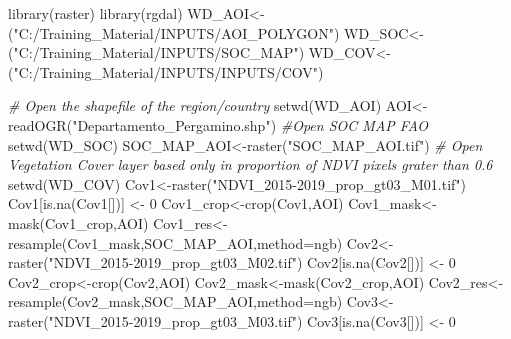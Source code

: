\documentclass[
  10pt,
  b5paper,
]{book}
\newenvironment{Shaded}{\begin{snugshade}}{\end{snugshade}}
\newcommand{\AttributeTok}[1]{\textcolor[rgb]{0.77,0.63,0.00}{#1}}
\newcommand{\CommentTok}[1]{\textcolor[rgb]{0.56,0.35,0.01}{\textit{#1}}}
\newcommand{\DecValTok}[1]{\textcolor[rgb]{0.00,0.00,0.81}{#1}}
\newcommand{\FunctionTok}[1]{\textcolor[rgb]{0.00,0.00,0.00}{#1}}
\newcommand{\NormalTok}[1]{#1}
\newcommand{\OtherTok}[1]{\textcolor[rgb]{0.56,0.35,0.01}{#1}}
\newcommand{\StringTok}[1]{\textcolor[rgb]{0.31,0.60,0.02}{#1}}
\begin{document}
\begin{Shaded}
\begin{Highlighting}[]
\FunctionTok{library}\NormalTok{(raster)}
\FunctionTok{library}\NormalTok{(rgdal)}
\NormalTok{WD\_AOI}\OtherTok{\textless{}{-}}\NormalTok{(}\StringTok{"C:/Training\_Material/INPUTS/AOI\_POLYGON"}\NormalTok{)}
\NormalTok{WD\_SOC}\OtherTok{\textless{}{-}}\NormalTok{(}\StringTok{"C:/Training\_Material/INPUTS/SOC\_MAP"}\NormalTok{)}
\NormalTok{WD\_COV}\OtherTok{\textless{}{-}}\NormalTok{(}\StringTok{"C:/Training\_Material/INPUTS/INPUTS/COV"}\NormalTok{)}


\CommentTok{\# Open the shapefile of the region/country}
\FunctionTok{setwd}\NormalTok{(WD\_AOI)}
\NormalTok{AOI}\OtherTok{\textless{}{-}}\FunctionTok{readOGR}\NormalTok{(}\StringTok{"Departamento\_Pergamino.shp"}\NormalTok{)}
\CommentTok{\#Open SOC MAP FAO}
\FunctionTok{setwd}\NormalTok{(WD\_SOC)}
\NormalTok{SOC\_MAP\_AOI}\OtherTok{\textless{}{-}}\FunctionTok{raster}\NormalTok{(}\StringTok{"SOC\_MAP\_AOI.tif"}\NormalTok{)}
\CommentTok{\# Open Vegetation Cover layer based only in proportion of NDVI pixels grater than 0.6 }
\FunctionTok{setwd}\NormalTok{(WD\_COV)}
\NormalTok{Cov1}\OtherTok{\textless{}{-}}\FunctionTok{raster}\NormalTok{(}\StringTok{"NDVI\_2015{-}2019\_prop\_gt03\_M01.tif"}\NormalTok{)}
\NormalTok{Cov1[}\FunctionTok{is.na}\NormalTok{(Cov1[])] }\OtherTok{\textless{}{-}} \DecValTok{0}
\NormalTok{Cov1\_crop}\OtherTok{\textless{}{-}}\FunctionTok{crop}\NormalTok{(Cov1,AOI)}
\NormalTok{Cov1\_mask}\OtherTok{\textless{}{-}}\FunctionTok{mask}\NormalTok{(Cov1\_crop,AOI)}
\NormalTok{Cov1\_res}\OtherTok{\textless{}{-}}\FunctionTok{resample}\NormalTok{(Cov1\_mask,SOC\_MAP\_AOI,}\AttributeTok{method=}\StringTok{\textquotesingle{}ngb\textquotesingle{}}\NormalTok{) }
\NormalTok{Cov2}\OtherTok{\textless{}{-}}\FunctionTok{raster}\NormalTok{(}\StringTok{"NDVI\_2015{-}2019\_prop\_gt03\_M02.tif"}\NormalTok{)}
\NormalTok{Cov2[}\FunctionTok{is.na}\NormalTok{(Cov2[])] }\OtherTok{\textless{}{-}} \DecValTok{0}
\NormalTok{Cov2\_crop}\OtherTok{\textless{}{-}}\FunctionTok{crop}\NormalTok{(Cov2,AOI)}
\NormalTok{Cov2\_mask}\OtherTok{\textless{}{-}}\FunctionTok{mask}\NormalTok{(Cov2\_crop,AOI)}
\NormalTok{Cov2\_res}\OtherTok{\textless{}{-}}\FunctionTok{resample}\NormalTok{(Cov2\_mask,SOC\_MAP\_AOI,}\AttributeTok{method=}\StringTok{\textquotesingle{}ngb\textquotesingle{}}\NormalTok{) }
\NormalTok{Cov3}\OtherTok{\textless{}{-}}\FunctionTok{raster}\NormalTok{(}\StringTok{"NDVI\_2015{-}2019\_prop\_gt03\_M03.tif"}\NormalTok{)}
\NormalTok{Cov3[}\FunctionTok{is.na}\NormalTok{(Cov3[])] }\OtherTok{\textless{}{-}} \DecValTok{0}

\end{Highlighting}
\end{Shaded}
\end{document}
